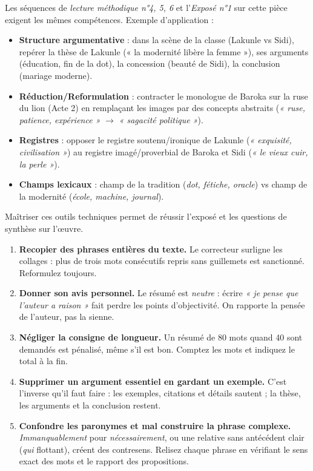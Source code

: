 \documentclass[11pt]{article}
\begin{document}
\begin{savaistu}
Les séquences de \emph{lecture méthodique n°4, 5, 6} et l'\emph{Exposé n°1} sur cette pièce exigent les mêmes compétences. Exemple d'application :
\begin{itemize}
\item \textbf{Structure argumentative} : dans la scène de la classe (Lakunle vs Sidi), repérer la thèse de Lakunle (« la modernité libère la femme »), ses arguments (éducation, fin de la dot), la concession (beauté de Sidi), la conclusion (mariage moderne).
\item \textbf{Réduction/Reformulation} : contracter le monologue de Baroka sur la ruse du lion (Acte 2) en remplaçant les images par des concepts abstraits (\emph{« ruse, patience, expérience »} $\rightarrow$ \emph{« sagacité politique »}).
\item \textbf{Registres} : opposer le registre soutenu/ironique de Lakunle (\emph{« exquisité, civilisation »}) au registre imagé/proverbial de Baroka et Sidi (\emph{« le vieux cuir, la perle »}).
\item \textbf{Champs lexicaux} : champ de la tradition (\emph{dot, fétiche, oracle}) vs champ de la modernité (\emph{école, machine, journal}).
\end{itemize}
Maîtriser ces outils techniques permet de réussir l'exposé et les questions de synthèse sur l'œuvre.
\end{savaistu}

\begin{attention}
\begin{enumerate}
\item \textbf{Recopier des phrases entières du texte.} Le correcteur surligne les collages : plus de trois mots consécutifs repris sans guillemets est sanctionné. Reformulez toujours.
\item \textbf{Donner son avis personnel.} Le résumé est \emph{neutre} : écrire \emph{« je pense que l'auteur a raison »} fait perdre les points d'objectivité. On rapporte la pensée de l'auteur, pas la sienne.
\item \textbf{Négliger la consigne de longueur.} Un résumé de 80 mots quand 40 sont demandés est pénalisé, même s'il est bon. Comptez les mots et indiquez le total à la fin.
\item \textbf{Supprimer un argument essentiel en gardant un exemple.} C'est l'inverse qu'il faut faire : les exemples, citations et détails sautent ; la thèse, les arguments et la conclusion restent.
\item \textbf{Confondre les paronymes et mal construire la phrase complexe.} \emph{Immanquablement} pour \emph{nécessairement}, ou une relative sans antécédent clair (\emph{qui} flottant), créent des contresens. Relisez chaque phrase en vérifiant le sens exact des mots et le rapport des propositions.
\end{enumerate}
\end{attention}
\end{document}
